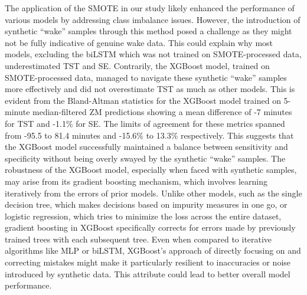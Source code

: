 \documentclass[
  10pt,
]{scrbook}
\begin{document}
The application of the SMOTE in our study likely enhanced the
performance of various models by addressing class imbalance issues.
However, the introduction of synthetic ``wake'' samples through this
method posed a challenge as they might not be fully indicative of
genuine wake data. This could explain why most models, excluding the
biLSTM which was not trained on SMOTE-processed data, underestimated TST
and SE. Contrarily, the XGBoost model, trained on SMOTE-processed data,
managed to navigate these synthetic ``wake'' samples more effectively
and did not overestimate TST as much as other models. This is evident
from the Bland-Altman statistics for the XGBoost model trained on
5-minute median-filtered ZM predictions showing a mean difference of -7
minutes for TST and -1.1\% for SE. The limits of agreement for these
metrics spanned from -95.5 to 81.4 minutes and -15.6\% to 13.3\%
respectively. This suggests that the XGBoost model successfully
maintained a balance between sensitivity and specificity without being
overly swayed by the synthetic ``wake'' samples. The robustness of the
XGBoost model, especially when faced with synthetic samples, may arise
from its gradient boosting mechanism, which involves learning
iteratively from the errors of prior models. Unlike other models, such
as the single decision tree, which makes decisions based on impurity
measures in one go, or logistic regression, which tries to minimize the
loss across the entire dataset, gradient boosting in XGBoost
specifically corrects for errors made by previously trained trees with
each subsequent tree. Even when compared to iterative algorithms like
MLP or biLSTM, XGBoost's approach of directly focusing on and correcting
mistakes might make it particularly resilient to inaccuracies or noise
introduced by synthetic data. This attribute could lead to better
overall model performance.
\end{document}
